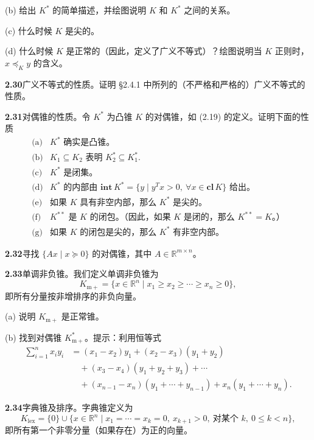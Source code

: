 \documentclass[UTF8, 12pt, fontset=fandol, oneside]{ctexart}
\begin{document}
\noindent(b) 给出 $K^*$ 的简单描述，并绘图说明 $K$ 和 $K^*$ 之间的关系。

\noindent(c) 什么时候 $K$ 是尖的。

\noindent(d) 什么时候 $K$ 是正常的（因此，定义了广义不等式）？绘图说明当 $K$ 正则时，$x\preceq_K y$ 的含义。

\noindent\textbf{2.30}\quad 广义不等式的性质。证明 \S2.4.1 中所列的（不严格和严格的）广义不等式的性质。

\noindent\textbf{2.31}\quad 对偶锥的性质。令 $K^*$ 为凸锥 $K$ 的对偶锥，如 (2.19) 的定义。证明下面的性质
\[
  \begin{array}{ll}
  \text{(a)} & K^*\text{ 确实是凸锥。}\\
  \text{(b)} & K_1\subseteq K_2\text{ 表明 }K_2^*\subseteq K_1^*.\\
  \text{(c)} & K^*\text{ 是闭集。}\\
  \text{(d)} & K^*\text{ 的内部由 }\mathbf{int}\,K^*=\{y\mid y^Tx>0,\ \forall x\in\mathbf{cl}\,K\}\text{ 给出。}\\
  \text{(e)} & \text{如果 }K\text{ 具有非空内部，那么 }K^*\text{ 是尖的。}\\
  \text{(f)} & K^{**}\text{ 是 }K\text{ 的闭包。（因此，如果 }K\text{ 是闭的，那么 }K^{**}=K\text{。）}\\
  \text{(g)} & \text{如果 }K\text{ 的闭包是尖的，那么 }K^*\text{ 有非空内部。}
  \end{array}
\]

\noindent\textbf{2.32}\quad 寻找 $\{Ax\mid x\succeq0\}$ 的对偶锥，其中 $A\in\mathbb{R}^{m\times n}$。

\noindent\textbf{2.33}\quad 单调非负锥。我们定义单调非负锥为
\[
  K_{\mathrm{m}+}=\{x\in\mathbb{R}^n\mid x_1\ge x_2\ge\cdots\ge x_n\ge0\},
\]
即所有分量按非增排序的非负向量。

\noindent(a) 说明 $K_{\mathrm{m}+}$ 是正常锥。

\noindent(b) 找到对偶锥 $K_{\mathrm{m}+}^*$。提示：利用恒等式
\begin{align*}
  \sum_{i=1}^n x_iy_i
  &= (x_1-x_2)y_1+(x_2-x_3)(y_1+y_2)\\
  &\quad +(x_3-x_4)(y_1+y_2+y_3)+\cdots\\
  &\quad +(x_{n-1}-x_n)(y_1+\cdots+y_{n-1})+x_n(y_1+\cdots+y_n).
\end{align*}

\noindent\textbf{2.34}\quad 字典锥及排序。字典锥定义为
\[
  K_{\mathrm{lex}}=\{0\}\cup\{x\in\mathbb{R}^n\mid x_1=\cdots=x_k=0,\ x_{k+1}>0,\ \text{对某个 }k,\ 0\le k<n\},
\]
即所有第一个非零分量（如果存在）为正的向量。
\end{document}

